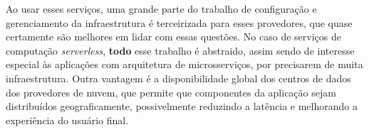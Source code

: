 Ao usar esses serviços, uma grande parte do trabalho de configuração e gerenciamento da infraestrutura é terceirizada para esses provedores, que quase certamente são melhores em lidar com essas questões. No caso de serviços de computação \emph{serverless}, \textbf{todo} esse trabalho é abstraido, assim sendo de interesse especial às aplicações com arquitetura de microsserviços, por precisarem de muita infraestrutura. Outra vantagem é a disponibilidade global dos centros de dados dos provedores de nuvem, que permite que componentes da aplicação sejam distribuídos geograficamente, possivelmente reduzindo a latência e melhorando a experiência do usuário final.







